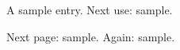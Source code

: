 \documentclass[12pt]{article}
\begin{document}
A \gls{sample} entry. Next use: \gls{sample}. 

\newpage
Next page: \gls{sample}. Again: \gls{sample}. 

\printglossaries 
\end{document}
